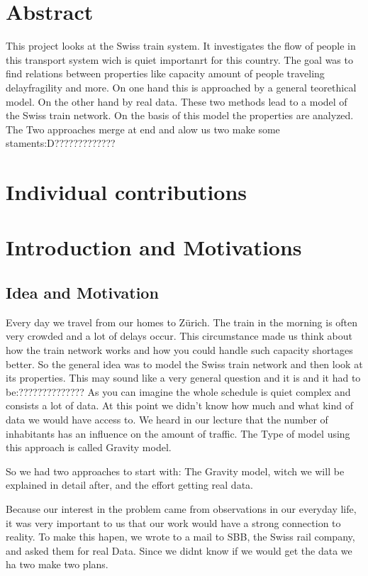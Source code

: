 \documentclass[11pt]{article}
\begin{document}
\section{Abstract}

This project looks at the Swiss train system. It investigates the flow of people in this transport system wich is quiet importanrt for this country. The goal was to find relations between properties like capacity amount of people traveling delayfragility and more. On one hand this is approached  by a general teorethical model. On the other hand by real data. These two methods lead to a model of the Swiss train  network. On the basis of this model the properties are analyzed. The Two approaches merge at end and alow us two make some staments:D?????????????
 

\section{Individual contributions}

\section{Introduction and Motivations}

\subsection{Idea and Motivation}


Every day we travel from our homes to Zürich. The train in the morning is often very crowded and a lot of delays occur. This circumstance made us think about how the train network works and how you could handle such capacity shortages better. 
So the general idea was to model the Swiss train network and then look at its properties. This may sound like a very general question and it is and it had to be:?????????????? As you can imagine the whole schedule is quiet complex and consists a lot of data. At this point we didn't know how much and what kind of data we would have access to. We heard in our lecture that the number of inhabitants has an influence on the amount of traffic. The Type of model using this approach is called Gravity model.

So we had two approaches to start with: The Gravity model, witch we will be explained in detail after, and the effort getting real data.

Because our interest in the problem came from observations in our everyday life, it was very important to us that our work would have a strong connection to reality. To make this hapen, we wrote to a mail to SBB, the Swiss rail company, and asked them for real Data. Since we didnt know if we would get the data we ha two make two plans.
\end{document}
